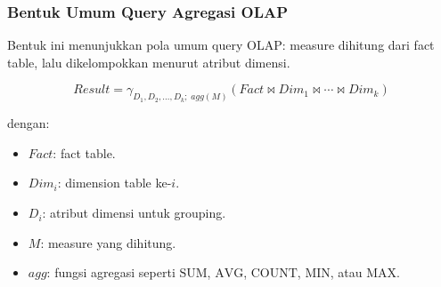 \subsubsection{Bentuk Umum Query Agregasi OLAP}

\begin{jawab}
Bentuk ini menunjukkan pola umum query OLAP: measure dihitung dari fact table, lalu dikelompokkan menurut atribut dimensi.
\end{jawab}

\begin{equation}
    Result = \gamma_{D_1,D_2,\ldots,D_k;\; agg(M)}(Fact \bowtie Dim_1 \bowtie \cdots \bowtie Dim_k)
    \label{eq:olap-aggregation}
\end{equation}

dengan:
\begin{itemize}
    \item \(Fact\): fact table.
    \item \(Dim_i\): dimension table ke-\(i\).
    \item \(D_i\): atribut dimensi untuk grouping.
    \item \(M\): measure yang dihitung.
    \item \(agg\): fungsi agregasi seperti \(\mathrm{SUM}\), \(\mathrm{AVG}\), \(\mathrm{COUNT}\), \(\mathrm{MIN}\), atau \(\mathrm{MAX}\).
\end{itemize}
